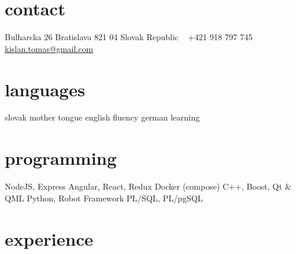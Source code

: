 \documentclass[]{friggeri-cv} %
\begin{document}


\begin{aside} %
\section{contact}
Bulharska 26
Bratislava 821 04
Slovak Republic
~
+421 918 797 745
~
\href{mailto:kislan.tomas@gmail.com}{kislan.tomas@gmail.com}
\section{languages}
slovak mother tongue
english fluency
german learning
\section{programming}
NodeJS, Express
Angular, React, Redux
Docker (compose)
C++, Boost, Qt \& QML
Python, Robot Framework
PL/SQL, PL/pgSQL
\end{aside}


\section{experience}
\end{document}
